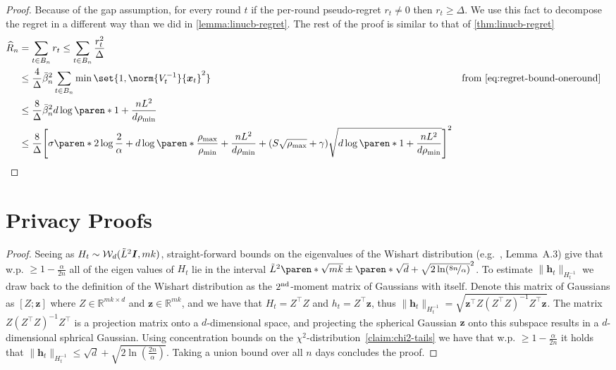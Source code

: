\documentclass{article}
\renewcommand{\vec}[1]{\bm{#1}}
\newcommand{\inv}[1]{#1^{-1}}
\newcommand{\Real}{\mathds{R}}
\DeclarePairedDelimiter{\paren}()
\DeclarePairedDelimiter{\brck}{[}{]}
\providecommand\transp{\top}
\let\transpsymbol\transp
\renewcommand{\transp}[1]{#1^\transpsymbol}
\newcommand{\Wishart}{\mathcal{W}}
\newcommand{\Eye}[1][]{\bm{I}\notblank{#1}{_{{#1}\times{#1}}}{}}
\begin{document}
\ThmLinUCBGapRegret*

\begin{proof}
  Because of the gap assumption, for every round $t$ if the per-round
  pseudo-regret $r_t \neq 0$ then $r_t \ge \Delta$.  We use this fact
  to decompose the regret in a different way than we did in
  \cref{lemma:linucb-regret}.  The rest of the proof is similar to
  that of \cref{thm:linucb-regret}
  \begin{align*}
    \widehat R_n
    &= \sum_{t\in B_n} r_t \le \sum_{t\in B_n} \frac{r_t^2}{\Delta} \\
    &\le \frac{4}{\Delta} \bar\beta_n^2 \sum_{t\in B_n} \min\set{1, \norm{\inv{V_t}}{\vec x_t}^2}
    &\text{from~\eqref{eq:regret-bound-oneround}} \\
    &\le \frac{8}{\Delta} \bar\beta_n^2d\log\paren*{1+\frac{nL^2}{d\rho_{\min}}} \\
    &\le \frac{8}{\Delta} \brck*{\sigma\paren*{2\log\frac{2}{\alpha}
      + d\log\paren*{\frac{\rho_{\max}}{\rho_{\min}} + \frac{nL^2}{d\rho_{\min}}}}
      + (S\sqrt{\rho_{\max}}+\gamma)\sqrt{d\log\paren*{1+\frac{nL^2}{d\rho_{\min}}}}}^2
    &&\qedhere
  \end{align*}

\end{proof}

\section{Privacy Proofs}

\PropWishartTails*
\begin{proof}
Seeing as $H_t\sim\Wishart_d(\tilde L^2 \Eye, mk)$, straight-forward bounds on the eigenvalues of the Wishart distribution (e.g.~\cite{SheffetPrivateApproxRegression2015}, Lemma~A.3) give that w.p. $\geq 1- \tfrac \alpha{2n}$ all of the eigen values of $H_t$ lie in the interval $\tilde L^2 \paren*{\sqrt{mk} \pm \paren*{\sqrt{d} + \sqrt{2\ln(\nicefrac{8n}{\alpha})}}}^2$. To estimate $\|\vec h_t\|_{H_t^{-1}}$ we draw back to the definition of the Wishart distribution as the $2^{\rm nd}$-moment matrix of Gaussians with itself. Denote this matrix of Gaussians as $[Z ; \vec z]$ where $Z\in \Real^{mk\times d}$ and $\vec z \in \Real^{mk}$, and we have that $H_t = \transp Z Z$ and $h_t = \transp Z \vec z$, thus $\|\vec h_t\|_{H_t^{-1}} = \sqrt{ \transp{\vec z} Z (\transp Z Z)^{-1}  \transp Z \vec z }$. The matrix $Z (\transp Z Z)^{-1}  \transp Z$ is a projection matrix onto a $d$-dimensional space, and projecting the spherical Gaussian $\vec z$ onto this subspace results in a $d$-dimensional sphrical Gaussian. Using concentration bounds on the $\chi^2$-distribution~\ref{claim:chi2-tails} we have that w.p. $\geq 1- \tfrac \alpha{2n}$ it holds that $\|\vec h_t\|_{H_t^{-1}}\leq \sqrt{d} + \sqrt{2\ln(\tfrac{2n}{\alpha})}$. Taking a union bound over all $n$ days concludes the proof.
\end{proof}
\end{document}
